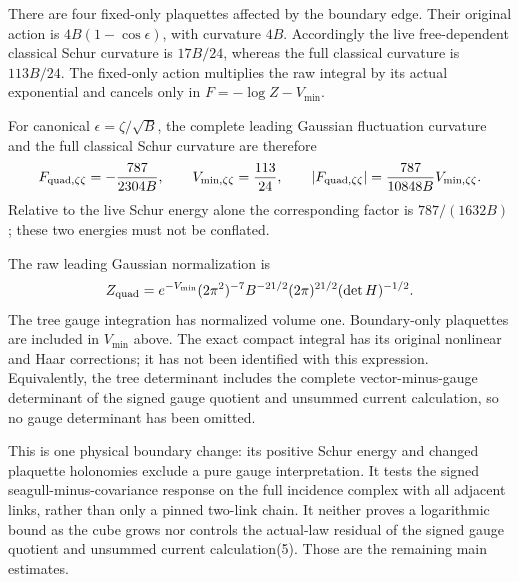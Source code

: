 \documentclass[11pt]{article}
\begin{document}
There are four fixed-only plaquettes affected by the boundary edge.
Their original action is $4B(1-\cos\epsilon)$, with curvature $4B$.
Accordingly the live free-dependent classical Schur curvature is
$17B/24$, whereas the full classical curvature is $113B/24$.
The fixed-only action multiplies the raw integral by its actual exponential
and cancels only in $F=-\log Z-V_{\min}$.

For canonical $\epsilon=\zeta/\sqrt B$, the complete leading Gaussian
fluctuation curvature and the full classical Schur curvature are therefore
\[
 F_{{\rm quad},\zeta\zeta}=-\frac{787}{2304B},\qquad
 V_{\min,\zeta\zeta}=\frac{113}{24},\qquad
 |F_{{\rm quad},\zeta\zeta}|=\frac{787}{10848B}V_{\min,\zeta\zeta}.
\]
Relative to the live Schur energy alone the corresponding factor is
$787/(1632B)$; these two energies must not be conflated.

The raw leading Gaussian normalization is
\[
 Z_{\rm quad}
 =e^{-V_{\min}}(2\pi^2)^{-7}B^{-21/2}(2\pi)^{21/2}
                 (\det H)^{-1/2}.
\]
The tree gauge integration has normalized volume one. Boundary-only
plaquettes are included in $V_{\min}$ above. The exact compact integral
has its original nonlinear and Haar corrections; it has not been
identified with this expression. Equivalently, the tree determinant
includes the complete vector-minus-gauge determinant of the signed gauge quotient and unsummed current calculation,
so no gauge determinant has been omitted.

This is one physical boundary change: its positive Schur energy and
changed plaquette holonomies exclude a pure gauge interpretation.
It tests the signed seagull-minus-covariance response on the full incidence
complex with all adjacent links, rather than only a pinned two-link chain.
It neither proves a logarithmic bound as the cube grows nor controls the
actual-law residual of the signed gauge quotient and unsummed current calculation(5). Those are the remaining main estimates.
\end{document}
